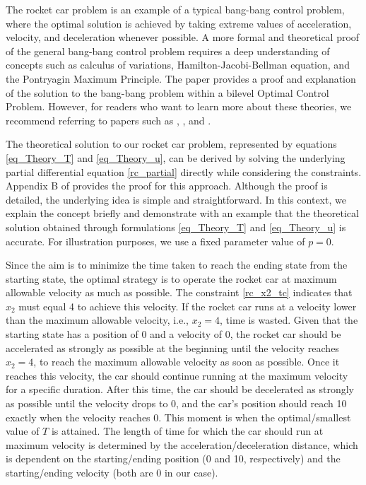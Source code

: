 \documentclass  [
  paper    = a4,
  BCOR     = 10mm,
  twoside,
  fontsize = 12pt,
  fleqn,
  toc      = bibnumbered,
  toc      = listofnumbered,
  numbers  = noendperiod,
  headings = normal,
  listof   = leveldown,
  version  = 3.03
]                                       {scrreprt}
\newcommand{\<}{\langle}
\renewcommand{\>}{\rangle}
\begin{document}
The rocket car problem is an example of a typical bang-bang control problem, where the optimal solution is achieved by taking extreme values of acceleration, velocity, and deceleration whenever possible. A more formal and theoretical proof of the general bang-bang control problem requires a deep understanding of concepts such as calculus of variations, Hamilton-Jacobi-Bellman equation, and the Pontryagin Maximum Principle. The paper \cite{KM16} provides a proof and explanation of the solution to the bang-bang problem within a bilevel Optimal Control Problem. However, for readers who want to learn more about these theories, we recommend referring to papers such as \cite{EJ89}, \cite{RV99}, and \cite{BD05}.

The theoretical solution to our rocket car problem, represented by equations \ref{eq_Theory_T} and \ref{eq_Theory_u}, can be derived by solving the underlying partial differential equation \ref{rc_partial} directly while considering the constraints. Appendix B of \cite{MatSch22} provides the proof for this approach. Although the proof is detailed, the underlying idea is simple and straightforward. In this context, we explain the concept briefly and demonstrate with an example that the theoretical solution obtained through formulations \ref{eq_Theory_T} and \ref{eq_Theory_u} is accurate. For illustration purposes, we use a fixed parameter value of $p=0$.

Since the aim is to minimize the time taken to reach the ending state from the starting state, the optimal strategy is to operate the rocket car at maximum allowable velocity as much as possible. The constraint \ref{rc_x2_tc} indicates that $x_2$ must equal 4 to achieve this velocity. If the rocket car runs at a velocity lower than the maximum allowable velocity, i.e., $x_2=4$, time is wasted. Given that the starting state has a position of 0 and a velocity of 0, the rocket car should be accelerated as strongly as possible at the beginning until the velocity reaches $x_2=4$, to reach the maximum allowable velocity as soon as possible. Once it reaches this velocity, the car should continue running at the maximum velocity for a specific duration. After this time, the car should be decelerated as strongly as possible until the velocity drops to 0, and the car's position should reach 10 exactly when the velocity reaches 0. This moment is when the optimal/smallest value of $T$ is attained. The length of time for which the car should run at maximum velocity is determined by the acceleration/deceleration distance, which is dependent on the starting/ending position (0 and 10, respectively) and the starting/ending velocity (both are 0 in our case).
\end{document}
